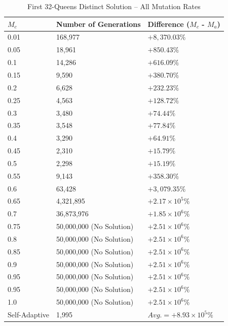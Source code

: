\documentclass[conference]{IEEEtran}
\begin{document}
\begin{table}
\centering
\caption{First 32-Queens Distinct Solution -- All Mutation Rates}
{\renewcommand{\arraystretch}{1.2}
\begin{tabular}{|l|l|l|} \hline
$M_{c}$&    Number of Generations&            Difference ($M_{c}$ - $M_{a}$)\\ \hline
0.01&            168,977&                    $ +8,370.03\% $ \\ \hline
0.05&            18,961&                     $ +850.43\% $ \\ \hline
0.1&             14,286&                     $ +616.09\% $ \\ \hline
0.15&            9,590&                      $ +380.70\% $ \\ \hline
0.2&             6,628&                      $ +232.23\% $ \\ \hline
0.25&            4,563&                      $ +128.72\% $ \\ \hline
0.3&             3,480&                      $ +74.44\% $ \\ \hline
0.35&            3,548&                      $ +77.84\% $ \\ \hline
0.4&             3,290&                      $ +64.91\% $ \\ \hline
0.45&            2,310&                      $ +15.79\% $ \\ \hline
0.5&             2,298&                      $ +15.19\% $ \\ \hline
0.55&            9,143&                      $ +358.30\% $ \\ \hline
0.6&             63,428&                     $ +3,079.35\% $ \\ \hline
0.65&            4,321,895&                  $ +2.17\times10^{5}\% $ \\ \hline
0.7&             36,873,976&                 $ +1.85\times10^{6}\% $ \\ \hline
0.75&            50,000,000 (No Solution)&   $ +2.51\times10^{6}\% $ \\ \hline
0.8&             50,000,000 (No Solution)&   $ +2.51\times10^{6}\% $ \\ \hline
0.85&            50,000,000 (No Solution)&   $ +2.51\times10^{6}\% $ \\ \hline
0.9&             50,000,000 (No Solution)&   $ +2.51\times10^{6}\% $ \\ \hline
0.95&            50,000,000 (No Solution)&   $ +2.51\times10^{6}\% $ \\ \hline
0.95&            50,000,000 (No Solution)&   $ +2.51\times10^{6}\% $ \\ \hline
1.0&             50,000,000 (No Solution)&   $ +2.51\times10^{6}\% $ \\ \hline \hline
Self-Adaptive&   1,995&                      $ Avg. = +8.93\times10^{5}\% $ \\ \hline
\end{tabular}}
\label{table:firstsol_32q}
\end{table}
\end{document}
